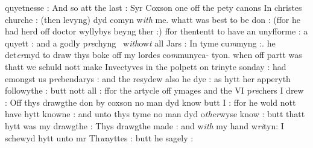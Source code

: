 \documentclass[12pt, a4paper]{book}
\begin{document}
		\ifthenelse{\isodd{\thepage}}
		{\reversemarginpar}
		{\normalmarginpar}
		quyetnesse : And so att the last : Syr Coxson one off the pety canons In christes churche : (then levyng) dyd comyn w\textit{ith} me. whatt was best to be don : (ffor he had herd off doctor wyllybys beyng ther :) ffor thententt to have an unyfforme : a quyett : and a godly p\textit{re}chyng  w\textit{ith}ow\textit{t} all Jars : In tyme cu\textit{m}myng :. he det\textit{er}myd to draw thys boke off my lordes co\textit{m}munyca- tyon. when off partt was thatt we schuld nott make Invectyves in the polpett
			 on trinyte sonday : had emongst us p\textit{re}bendarys : and the resydew also he dye
			 : as hytt her apperyth
			 followythe : butt nott all : ffor the artycle off ymages and the VI p\textit{re}chers I drew : Off thys drawgthe don by coxson no man dyd know butt I :  ffor he wold nott have hytt knowne : and unto thys tyme no man dyd o\textit{ther}wyse know : butt thatt hytt was my drawgthe : Thys drawgthe made : and w\textit{ith} my hand w\textit{ri}tyn: I schewyd hytt unto mr Th\textit{w}ayttes : butt he sagely : 
            		
			
\end{document}
